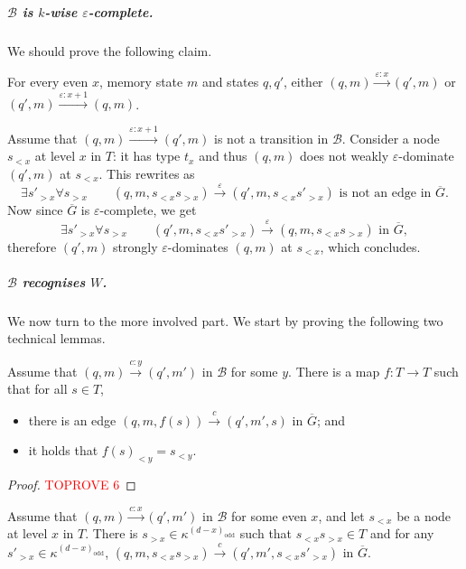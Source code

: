 \documentclass[a4paper,UKenglish,cleveref, thm-restate]{lipics-v2021}
\newcommand{\re}[1]{\xrightarrow{#1}}
\newcommand{\tin}{\text{ in }}
\newcommand{\eps}{\varepsilon}
\newcommand{\odd}{\mathrm{odd}}
\newcommand{\B}{\mathcal B}
\begin{document}
\subparagraph*{$\B$ is $k$-wise $\eps$-complete.}

We should prove the following claim.

\begin{claim}
    For every even $x$, memory state $m$ and states $q,q'$, either $(q,m) \re{\eps:x} (q',m)$ or $(q',m) \re{\eps:x+1} (q,m)$.
\end{claim}

\begin{claimproof}
    Assume that $(q,m) \re{\eps:x+1} (q',m)$ is not a transition in $\B$.
    Consider a node $s_{<x}$ at level $x$ in $T$: it has type $t_x$ and thus $(q,m)$ does not weakly $\eps$-dominate $(q',m)$ at $s_{<x}$.
    This rewrites as
    \[
        \exists s'_{> x} \forall s_{> x} \qquad (q,m,s_{< x} s_{>x}) \re \eps (q',m,s_{< x} s'_{>x}) \text{ is not an edge in } \overline G.
    \]
    Now since $\overline G$ is $\eps$-complete, we get 
    \[
        \exists s'_{> x} \forall s_{> x} \qquad (q',m,s_{< x} s'_{>x}) \re \eps (q,m,s_{< x} s_{>x}) \tin \overline G,
    \]
    therefore $(q',m)$ strongly $\eps$-dominates $(q,m)$ at $s_{<x}$, which concludes.
\end{claimproof}


\subparagraph*{$\B$ recognises $W$.}

We now turn to the more involved part.
We start by proving the following two technical lemmas.

\begin{lemma}\label{lem:technical1}
Assume that $(q,m) \re{c:y} (q',m') \tin \B$ for some $y$.
There is a map $f:T \to T$ such that for all $s \in T$, 
\begin{itemize}
    \item there is an edge $(q,m,f(s)) \re c (q',m',s)$ in $\overline G$; and
    \item it holds that $f(s)_{< y} = s_{< y}$.
\end{itemize}
\end{lemma}

\begin{proof}\textcolor{red}{TOPROVE 6}\end{proof}

\begin{lemma}\label{lem:technical2}
    Assume that $(q,m) \re{c:x} (q',m') \tin \B$ for some even $x$, and let $s_{< x}$ be a node at level $x$ in $T$.
    There is $s_{> x} \in \kappa^{(d-x)_\odd}$ such that $s_{< x}s_{> x} \in T$ and for any $s'_{> x} \in \kappa^{(d-x)_\odd}$, $(q,m,s_{< x}s_{> x}) \re c (q',m',s_{<x}s'_{> x})$ in $\overline G$.
\end{lemma}
\end{document}
